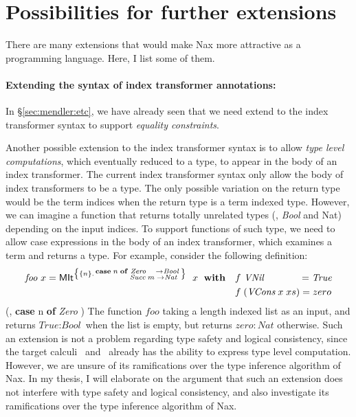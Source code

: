 \section{Possibilities for further extensions}\label{sec:ext}
There are many extensions that would make Nax more attractive
as a programming language. Here, I list some of them.

\paragraph{Extending the syntax of index transformer annotations:}
In \S\ref{sec:mendler:etc}, we have already seen that we need extend
to the index transformer syntax to support
\emph{equality constraints}.

Another possible extension to the index transformer syntax is to allow
\emph{type level computations}, which eventually reduced to a type,
to appear in the body of an index transformer. The current index
transformer syntax only allow the body of index transformers to be a type.
The only possible variation on the return type would be the term indices
when the return type is a term indexed type. However, we can imagine
a function that returns totally unrelated types (\eg, \textit{Bool} and Nat)
depending on the input indices. To support functions of such type, we need
to allow case expressions in the body of an index transformer, which examines
a term and returns a type. For example, consider the following definition:
\begin{align*}
\textit{foo}~x =
 \textsf{MIt}^{\left\{\{n\} . \begin{smallmatrix}\textbf{case}\;n\;\textbf{of}
                                        &\textit{Zero}~~~  -> \textit{Bool} \\
                                        &\textit{Succ}\;m\;-> \textit{Nat}\;
                                        \end{smallmatrix}
       \right\}}~\;x~\;\textbf{with}
&\quad  f ~\textit{VNil}~~~~~~~~~~~ = \textit{True} \\
&\quad  f \;(\textit{VCons}\;x\;xs) = zero
\end{align*}
 (\eg, \textbf{case} n \textbf{of} \textit{Zero} )
The function $foo$ taking a length indexed list as an input, and returns
$\textit{True} : \textit{Bool}$ when the list is empty, but returns
$zero : \textit{Nat}$ otherwise. Such an extension is not a problem regarding
type safety and logical consistency, since the target calculi \Fi\ and \Fixi\
already has the ability to express type level computation. However, we are
unsure of its ramifications over the type inference algorithm of Nax. In my
thesis, I will elaborate on the argument that such an extension does not
interfere with type safety and logical consistency, and also investigate
its ramifications over the type inference algorithm of Nax.

